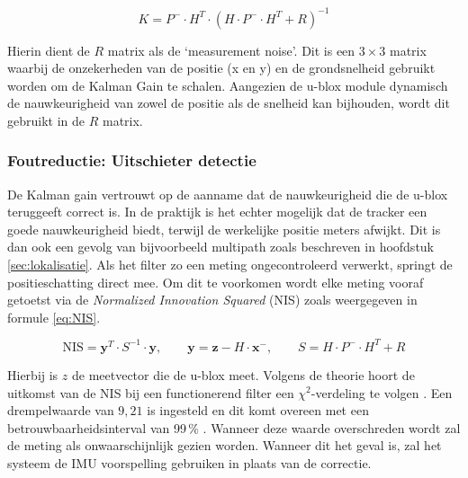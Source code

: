\begin{equation}
    K = P^- \cdot H^T \cdot (H \cdot P^- \cdot H^T + R)^{-1}
    \label{eq:kalman_gain}
\end{equation}

Hierin dient de $R$ matrix als de `measurement noise'. Dit is een $3 \times 3$ matrix waarbij de onzekerheden van de positie (x en y) en de grondsnelheid gebruikt worden om de Kalman Gain te schalen. Aangezien de u-blox module dynamisch de nauwkeurigheid van zowel de positie als de snelheid kan bijhouden, wordt dit gebruikt in de $R$ matrix.

\subsubsection{Foutreductie: Uitschieter detectie}

De Kalman gain vertrouwt op de aanname dat de nauwkeurigheid die de u-blox teruggeeft correct is. In de praktijk is het echter mogelijk dat de tracker een goede nauwkeurigheid biedt, terwijl de werkelijke positie meters afwijkt. Dit is dan ook een gevolg van bijvoorbeeld multipath zoals beschreven in hoofdstuk \ref{sec:lokalisatie}. Als het filter zo een meting ongecontroleerd verwerkt, springt de positieschatting direct mee. Om dit te voorkomen wordt elke meting vooraf getoetst via de \textit{Normalized Innovation Squared} (NIS) zoals weergegeven in formule \ref{eq:NIS}.

\begin{equation}
    \text{NIS} = \mathbf{y}^T \cdot S^{-1} \cdot \mathbf{y},
    \qquad \mathbf{y} = \mathbf{z} - H \cdot \mathbf{x}^-, \qquad
    S = H \cdot P^- \cdot H^T + R
    \label{eq:NIS}
\end{equation}

Hierbij is $z$ de meetvector die de u-blox meet. Volgens de theorie hoort de uitkomst van de NIS bij een functionerend filter een $\chi^2$-verdeling te volgen \cite{kalman_filter_com_nis}. Een drempelwaarde van $9{,}21$ is ingesteld en dit komt overeen met een betrouwbaarheidsinterval van 99\,\% \cite{medcalc_chisquare}. Wanneer deze waarde overschreden wordt zal de meting als onwaarschijnlijk gezien worden. Wanneer dit het geval is, zal het systeem de IMU voorspelling gebruiken in plaats van de correctie.

\newpage
